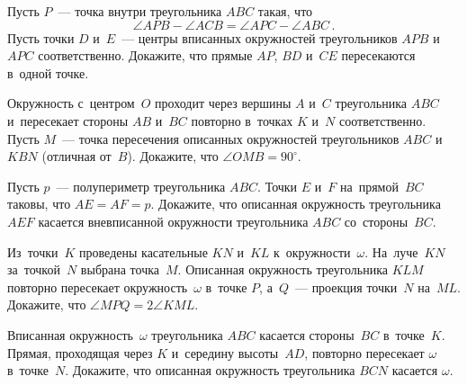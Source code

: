 \begin{problems}
\item
Пусть $P$~--- точка внутри треугольника $ABC$ такая, что
\[
    \angle APB - \angle ACB = \angle APC - \angle ABC
\, . \]
Пусть точки $D$ и~$E$~--- центры вписанных окружностей
треугольников $APB$ и~$APC$ соответственно.
Докажите, что прямые $AP$, $BD$ и~$CE$ пересекаются в~одной точке.

\item
Окружность с~центром~$O$ проходит через вершины $A$ и~$C$ треугольника $ABC$
и~пересекает стороны $AB$ и~$BC$ повторно в~точках $K$ и~$N$ соответственно.
Пусть $M$~--- точка пересечения описанных окружностей треугольников $ABC$
и~$KBN$ (отличная от~$B$).
Докажите, что $\angle OMB = 90^{\circ}$.

\item
Пусть $p$~--- полупериметр треугольника $ABC$.
Точки $E$ и~$F$ на~прямой~$BC$ таковы, что $AE = AF = p$.
Докажите, что описанная окружность треугольника $AEF$ касается вневписанной
окружности треугольника $ABC$ со~стороны~$BC$.

\item
Из~точки~$K$ проведены касательные $KN$ и~$KL$ к~окружности~$\omega$.
На~луче~$KN$ за~точкой~$N$ выбрана точка~$M$.
Описанная окружность треугольника $KLM$ повторно пересекает окружность~$\omega$
в~точке $P$, а~$Q$~--- проекция точки~$N$ на~$ML$.
Докажите, что $\angle MPQ = 2 \angle KML$.

\item
Вписанная окружность~$\omega$ треугольника $ABC$ касается стороны~$BC$
в~точке~$K$.
Прямая, проходящая через $K$ и~середину высоты~$AD$, повторно пересекает
$\omega$ в~точке~$N$.
Докажите, что описанная окружность треугольника $BCN$ касается $\omega$.

\end{problems}

